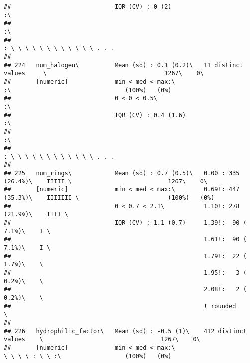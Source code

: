 \documentclass[]{article}
\begin{document}
\begin{verbatim}
##                             IQR (CV) : 0 (2)                                :\                                                  
##                                                                             :\                                                  
##                                                                             : \ \ \ \ \ \ \ \ \ \ \ \ . . .                     
## 
## 224   num_halogen\          Mean (sd) : 0.1 (0.2)\   11 distinct values     \                                 1267\    0\       
##       [numeric]             min < med < max:\                               :\                                (100%)   (0%)     
##                             0 < 0 < 0.5\                                    :\                                                  
##                             IQR (CV) : 0.4 (1.6)                            :\                                                  
##                                                                             :\                                                  
##                                                                             : \ \ \ \ \ \ \ \ \ \ \ \ . . .                     
## 
## 225   num_rings\            Mean (sd) : 0.7 (0.5)\   0.00 : 335 (26.4%)\    IIIII \                           1267\    0\       
##       [numeric]             min < med < max:\        0.69!: 447 (35.3%)\    IIIIIII \                         (100%)   (0%)     
##                             0 < 0.7 < 2.1\           1.10!: 278 (21.9%)\    IIII \                                              
##                             IQR (CV) : 1.1 (0.7)     1.39!:  90 ( 7.1%)\    I \                                                 
##                                                      1.61!:  90 ( 7.1%)\    I \                                                 
##                                                      1.79!:  22 ( 1.7%)\    \                                                   
##                                                      1.95!:   3 ( 0.2%)\    \                                                   
##                                                      2.08!:   2 ( 0.2%)\    \                                                   
##                                                      ! rounded              \                                                   
## 
## 226   hydrophilic_factor\   Mean (sd) : -0.5 (1)\    412 distinct values    \                                 1267\    0\       
##       [numeric]             min < med < max:\                               \ \ \ \ : \ \ :\                  (100%)   (0%)     

\end{verbatim}
\end{document}

